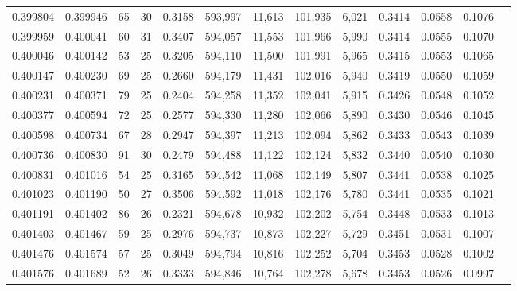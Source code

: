 \begin{tabular}{rrrrrrrrrrrrr}
0.399804 & 0.399946 &    65 &  30 &                                     0.3158 & 593,997 &  11,613 & 101,935 &   6,021 & 0.3414 & 0.0558 & 0.1076 \\
0.399959 & 0.400041 &    60 &  31 &                                     0.3407 & 594,057 &  11,553 & 101,966 &   5,990 & 0.3414 & 0.0555 & 0.1070 \\
0.400046 & 0.400142 &    53 &  25 &                                     0.3205 & 594,110 &  11,500 & 101,991 &   5,965 & 0.3415 & 0.0553 & 0.1065 \\
0.400147 & 0.400230 &    69 &  25 &                                     0.2660 & 594,179 &  11,431 & 102,016 &   5,940 & 0.3419 & 0.0550 & 0.1059 \\
0.400231 & 0.400371 &    79 &  25 &                                     0.2404 & 594,258 &  11,352 & 102,041 &   5,915 & 0.3426 & 0.0548 & 0.1052 \\
0.400377 & 0.400594 &    72 &  25 &                                     0.2577 & 594,330 &  11,280 & 102,066 &   5,890 & 0.3430 & 0.0546 & 0.1045 \\
0.400598 & 0.400734 &    67 &  28 &                                     0.2947 & 594,397 &  11,213 & 102,094 &   5,862 & 0.3433 & 0.0543 & 0.1039 \\
0.400736 & 0.400830 &    91 &  30 &                                     0.2479 & 594,488 &  11,122 & 102,124 &   5,832 & 0.3440 & 0.0540 & 0.1030 \\
0.400831 & 0.401016 &    54 &  25 &                                     0.3165 & 594,542 &  11,068 & 102,149 &   5,807 & 0.3441 & 0.0538 & 0.1025 \\
0.401023 & 0.401190 &    50 &  27 &                                     0.3506 & 594,592 &  11,018 & 102,176 &   5,780 & 0.3441 & 0.0535 & 0.1021 \\
0.401191 & 0.401402 &    86 &  26 &                                     0.2321 & 594,678 &  10,932 & 102,202 &   5,754 & 0.3448 & 0.0533 & 0.1013 \\
0.401403 & 0.401467 &    59 &  25 &                                     0.2976 & 594,737 &  10,873 & 102,227 &   5,729 & 0.3451 & 0.0531 & 0.1007 \\
0.401476 & 0.401574 &    57 &  25 &                                     0.3049 & 594,794 &  10,816 & 102,252 &   5,704 & 0.3453 & 0.0528 & 0.1002 \\
0.401576 & 0.401689 &    52 &  26 &                                     0.3333 & 594,846 &  10,764 & 102,278 &   5,678 & 0.3453 & 0.0526 & 0.0997 \\

\end{tabular}
